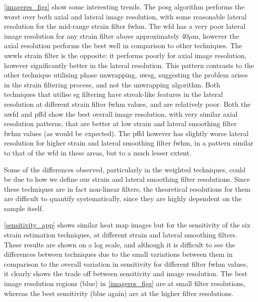 \autoref{imageres_figs} show some interesting trends. The \ac{posg} algorithm performs the worst over both axial and lateral image resolution, with some reasonable lateral resolution for the mid-range strain filter \ac{fwhm}. The \ac{wfd} has a very poor lateral image resolution for any strain filter above approximately 40$\mu$m, however the axial resolution performs the best well in comparison to other techniques. The \ac{uwwls} strain filter is the opposite: it performs poorly for axial image resolution, however significantly better in the lateral resolution. 
This pattern contrasts to the other technique utilising phase unwrapping, \ac{uwsg}, suggesting the problem arises in the strain filtering process, and not the unwrapping algorithm. 
Both techniques that utilise \ac{sg} filtering have streak-like features in the lateral resolution at different strain filter \ac{fwhm} values, and are relatively poor. 
Both the \ac{uwfd} and \ac{pffd} show the best overall image resolution, with very similar axial resolution patterns, that are better at low strain and lateral smoothing filter \ac{fwhm} values (as would be expected). The \ac{pffd} however has slightly worse lateral resolution for higher strain and lateral smoothing filter \ac{fwhm}, in a pattern similar to that of the \ac{wfd} in these areas, but to a much lesser extent.

Some of the differences observed, particularly in the weighted techniques, could be due to how we define our strain and lateral smoothing filter resolutions. Since these techniques are in fact non-linear filters, the theoretical resolutions for them are difficult to quantify systematically, since they are highly dependent on the sample itself.

\autoref{sensitivity_app} shows similar heat map images but for the sensitivity of the six strain estimation techniques, at different strain and lateral smoothing filters. These results are shown on a log scale, and although it is difficult to see the differences between techniques due to the small variations between them in comparison to the overall variation in sensitivity for different filter \ac{fwhm} values, it clearly shows the trade off between sensitivity and image resolution. The best image resolution regions (blue) in \autoref{imageres_figs} are at small filter resolutions, whereas the best sensitivity (blue again) are at the higher filter resolutions.
